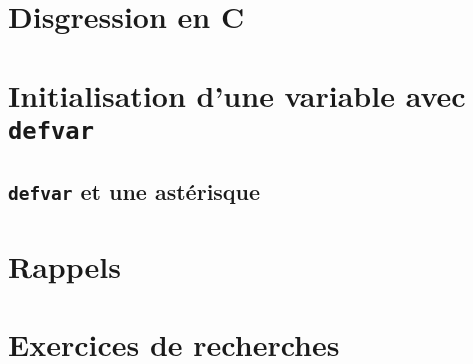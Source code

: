 \section{Disgression en C}

\section{Initialisation d'une variable avec
  \texttt{defvar}}

\subsection{\texttt{defvar} et une astérisque}

\section{Rappels}

\section{Exercices de recherches}

